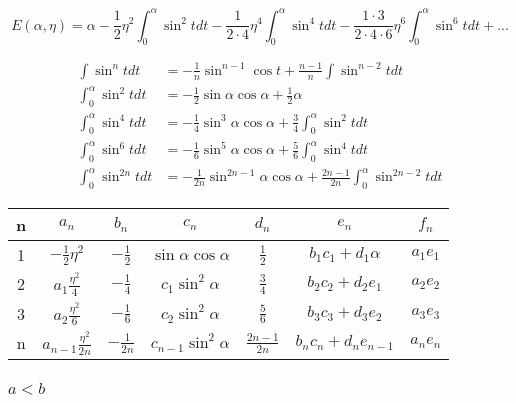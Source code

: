 \begin{equation}
E(\alpha, \eta) = \alpha -\frac{1}{2}\eta^2\int_0^\alpha \sin^2 tdt - \frac{1}{2 \cdot 4}\eta^4\int_0^\alpha \sin^4 tdt - \frac{1 \cdot 3}{2 \cdot 4 \cdot 6}\eta^6\int_0^\alpha \sin^6 tdt + ...
\end{equation}

\begin{equation}
\begin{aligned}
\int \sin^n t dt &= -\frac{1}{n} \sin^{n-1} \cos t + \frac{n-1}{n} \int \sin^{n-2} t dt \\
\int_0^\alpha \sin^2 tdt &=  -\frac{1}{2}\sin \alpha \cos\alpha + \frac{1}{2}\alpha \\
\int_0^\alpha \sin^4 t dt &= -\frac{1}{4}\sin^3 \alpha  \cos \alpha + \frac{3}{4} \int_0^\alpha \sin^2 t dt \\
\int_0^\alpha \sin^6 t dt &= -\frac{1}{6}\sin^5 \alpha  \cos \alpha + \frac{5}{6} \int_0^\alpha \sin^4 t dt \\
\int_0^\alpha \sin^{2n} t dt &= -\frac{1}{2n}\sin^{2n-1} \alpha  \cos \alpha + \frac{2n-1}{2n} \int_0^\alpha \sin^{2n-2} t dt 
\end{aligned}
\end{equation}

\begin{center}
\begin{tabular}{| c | c | c | c | c | c | c | }
\hline
n & $a_n$ & $b_n$ & $c_n$ & $d_n$ & $e_n$ & $f_n$\\ 
\hline
1 & $-\frac{1}{2}\eta^2$              &  $-\frac{1}{2}$    & $\sin\alpha \cos\alpha$ &  $\frac{1}{2}$        & $b_1c_1 + d_1\alpha$   & $a_1e_1$ \\ 
2 & $a_1 \frac{\eta^2}{4}$          &  $-\frac{1}{4}$    &  $c_1 \sin^2\alpha$       &  $\frac{3}{4}$        & $b_2c_2 + d_2e_1$       & $a_2e_2$   \\  
3 & $a_2 \frac{\eta^2}{6}$          &  $-\frac{1}{6}$    &  $c_2 \sin^2\alpha$       &  $\frac{5}{6}$        & $b_3c_3 + d_3e_2$       & $a_3e_3$   \\  
n & $a_{n-1} \frac{\eta^2}{2n}$ &   $-\frac{1}{2n}$ &  $c_{n-1} \sin^2\alpha$ & $\frac{2n-1}{2n}$ & $b_nc_n + d_ne_{n-1}$ & $a_ne_n$  \\
\hline
\end{tabular}
\end{center}



\subsubsection{$a < b$}

